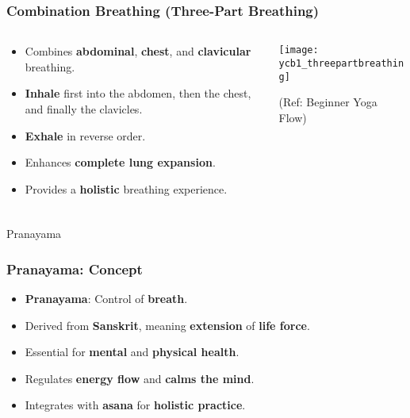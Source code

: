 \begin{frame}[fragile]\frametitle{Combination Breathing (Three-Part Breathing)}
\begin{columns}
    \begin{column}[T]{0.5\linewidth}
      \begin{itemize}
        \item Combines \textbf{abdominal}, \textbf{chest}, and \textbf{clavicular} breathing.
        \item \textbf{Inhale} first into the abdomen, then the chest, and finally the clavicles.
        \item \textbf{Exhale} in reverse order.
        \item Enhances \textbf{complete lung expansion}.
        \item Provides a \textbf{holistic} breathing experience.
      \end{itemize}
    \end{column}
    \begin{column}[T]{0.5\linewidth}
        \begin{center}
        \texttt{[image: ycb1\_threepartbreathing]}
				
		{\tiny (Ref: Beginner Yoga Flow)}	  
        \end{center}	
    \end{column}
\end{columns}
\end{frame}


\begin{frame}[fragile]\frametitle{}
\begin{center}
{\Large Pranayama}
\end{center}
\end{frame}

\begin{frame}[fragile]\frametitle{Pranayama: Concept}

      \begin{itemize}
        \item \textbf{Pranayama}: Control of \textbf{breath}.
        \item Derived from \textbf{Sanskrit}, meaning \textbf{extension} of \textbf{life force}.
        \item Essential for \textbf{mental} and \textbf{physical health}.
        \item Regulates \textbf{energy flow} and \textbf{calms the mind}.
        \item Integrates with \textbf{asana} for \textbf{holistic practice}.
      \end{itemize}

\end{frame}

